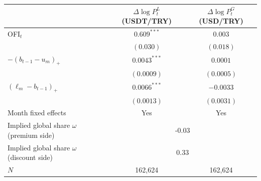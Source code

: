 \begin{tabular}{lcc}
\toprule
 & $\Delta\log P^L_t$ (USDT/TRY) & $\Delta\log P^G_t$ (USD/TRY) \\
\midrule
OFI$_t$ & $0.609^{***}$ & $0.003$ \\
 & $(0.030)$ & $(0.018)$ \\
$-(b_{t-1}-u_m)_+$ & $0.0043^{***}$ & $0.0001$ \\
 & $(0.0009)$ & $(0.0005)$ \\
$(\ell_m-b_{t-1})_+$ & $0.0066^{***}$ & $-0.0033$ \\
 & $(0.0013)$ & $(0.0031)$ \\
\midrule
Month fixed effects & Yes & Yes \\
Implied global share $\omega$ (premium side) & \multicolumn{2}{c}{-0.03} \\
Implied global share $\omega$ (discount side) & \multicolumn{2}{c}{0.33} \\
$N$ & 162,624 & 162,624 \\
\bottomrule
\end{tabular}
